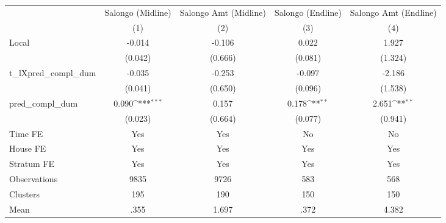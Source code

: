 {
\def\sym#1{\ifmmode^{#1}\else\(^{#1}\)\fi}
\begin{tabular}{l*{4}{c}}
\hline\hline
                &\multicolumn{1}{c}{Salongo (Midline)}&\multicolumn{1}{c}{Salongo Amt (Midline)}&\multicolumn{1}{c}{Salongo (Endline)}&\multicolumn{1}{c}{Salongo Amt (Endline)}\\
                &\multicolumn{1}{c}{(1)}         &\multicolumn{1}{c}{(2)}         &\multicolumn{1}{c}{(3)}         &\multicolumn{1}{c}{(4)}         \\
\hline
Local           &   -0.014         &   -0.106         &    0.022         &    1.927         \\
                &  (0.042)         &  (0.666)         &  (0.081)         &  (1.324)         \\
t\_lXpred\_compl\_dum&   -0.035         &   -0.253         &   -0.097         &   -2.186         \\
                &  (0.041)         &  (0.650)         &  (0.096)         &  (1.538)         \\
pred\_compl\_dum  &    0.090\sym{***}&    0.157         &    0.178\sym{**} &    2.651\sym{**} \\
                &  (0.023)         &  (0.664)         &  (0.077)         &  (0.941)         \\
Time FE         &      Yes         &      Yes         &       No         &       No         \\
House FE        &      Yes         &      Yes         &      Yes         &      Yes         \\
Stratum FE      &      Yes         &      Yes         &      Yes         &      Yes         \\
\hline
Observations    &     9835         &     9726         &      583         &      568         \\
Clusters        &      195         &      190         &      150         &      150         \\
Mean            &     .355         &    1.697         &     .372         &    4.382         \\
\hline\hline
\end{tabular}
}
